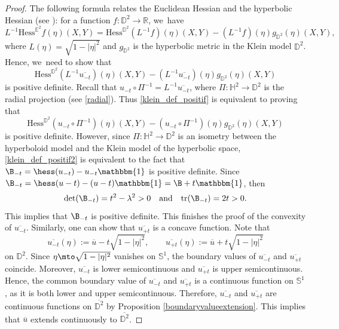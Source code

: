 \begin{proof}
The following formula relates the Euclidean Hessian and the hyperbolic Hessian (see \cite[Cor.\,2.7]{barbotfillastre}): for a function \(f: \mathbb{D}^2 \to \mathbb{R} \), we~have
\[
L^{-1} \mathrm{Hess}^{\mathbb{E}^2} f(\eta)(X,Y) = \mathrm{Hess}^{\mathbb{D}^2}(L^{-1} f)(\eta)(X,Y) - (L^{-1} f)(\eta) g_{\mathbb{D}^2}(\eta)(X,Y),
\]
where \(L(\eta) = \sqrt{1 - \lvert \eta \rvert^2} \) and \(g_{\mathbb{D}^2} \) is the hyperbolic metric in the Klein model \(\mathbb{D}^2\). Hence, we~need to show that
\begin{equation}\label{klein_def_positif}
\mathrm{Hess}^{\mathbb{D}^2}(L^{-1} \overline{u_{{-t}}})(\eta)(X,Y) - (L^{-1} \overline{u_{{-t}}})(\eta) g_{\mathbb{D}^2}(\eta)(X,Y)
\end{equation}
is positive definite. Recall that \(u_{-t} \circ \Pi^{-1} = L^{-1} \overline{u_{-t}} \), where \(\Pi: \mathbb{H}^2 \to \mathbb{D}^2 \) is the radial projection (see \eqref{radial}). Thus \eqref{klein_def_positif} is equivalent to proving that
\begin{equation}\label{klein_def_positif2}
\mathrm{Hess}^{\mathbb{D}^2}(u_{-t} \circ \Pi^{-1})(\eta)(X,Y) - (u_{-t} \circ \Pi^{-1})(\eta) g_{\mathbb{D}^2}(\eta)(X,Y)
\end{equation}
is positive definite. However, since \(\Pi: \mathbb{H}^2 \to \mathbb{D}^2\) is an isometry between the hyperboloid model and the Klein model of the hyperbolic space, \eqref{klein_def_positif2} is equivalent to the fact that \(\B_{{-t}} = \hess(u_{-t}) - u_{-t} \mathbbm{1} \) is positive definite. Since \(\B_{{-t}} = \hess(u - t) - (u - t) \mathbbm{1} = \B + t \mathbbm{1} \), then
\[
\det(\B_{{-t}}) = t^2 - \lambda^2 > 0 \quad \text{and} \quad \mathrm{tr}(\B_{{-t}}) = 2t > 0.
\]
This implies that \(\B_{{-t}} \) is positive definite. This finishes the proof of the convexity of \(\overline{u_{{-t}}} \). Similarly, one can show that \(\overline{u_{{+t}}} \) is a concave function.
Note that
\[
\overline{u_{-t}}(\eta) := \overline{u} - t\sqrt{1-\lvert\eta\rvert^2}, \qquad \overline{u_{+t}}(\eta) := \overline{u} +t\sqrt{1-\lvert\eta\rvert^2}
\]
on $\mathbb{D}^2$. Since $\eta\mto\sqrt{1-\lvert\eta\rvert^2}$ vanishes on $\mathbb{S}^1$, the boundary values of $\overline{u_{-t}}$ and $\overline{u_{+t}}$ coincide. Moreover, $\overline{u_{-t}}$ is lower semicontinuous and $\overline{u_{+t}}$ is upper semicontinuous. Hence, the common boundary value of $\overline{u_{-t}}$ and $\overline{u_{+t}}$ is a continuous function on $\mathbb{S}^1$, as it is both lower and upper semicontinuous. Therefore, $\overline{u_{-t}}$ and $\overline{u_{+t}}$ are continuous functions on $\overline{\mathbb{D}^2}$ by Proposition \ref{boundaryvalueextension}. This implies that $\overline{u}$ extends continuously to $\overline{\mathbb{D}^2}$.\end{proof}

